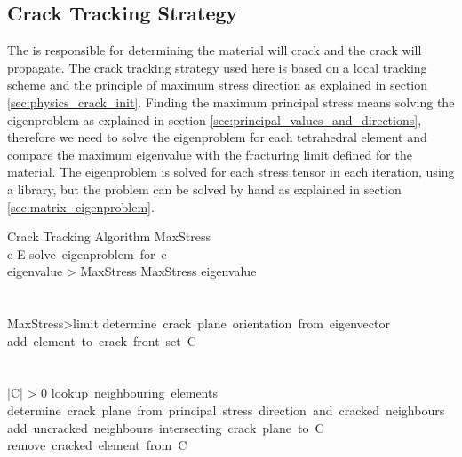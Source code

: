 \subsection*{Crack Tracking Strategy}
\label{sec:crack_tracking_strategy}
The  is responsible for determining
 the material will crack and  the crack will
propagate. The crack tracking strategy used here is
based on a local tracking scheme and the principle of maximum stress
direction as explained in section
\vref{sec:physics_crack_init}. Finding the maximum principal stress
means 
solving the eigenproblem as explained in section
\ref{sec:principal_values_and_directions}, therefore we need to
solve the eigenproblem for each tetrahedral element and compare the
maximum eigenvalue with the fracturing limit defined for the
material. The eigenproblem is solved for each stress tensor in each
iteration, using a 
library, but the problem can be solved by hand as 
explained in section \vref{sec:matrix_eigenproblem}. \\

\begin{center} 
\begin{minipage}[b]{\linewidth} 
\begin{pseudocode}[ruled]{Crack Tracking Algorithm}{ }
MaxStress \\
\FOREACH e \in E \DO
\BEGIN
  \mbox{solve eigenproblem for e}\\
  \IF eigenvalue > MaxStress \THEN
  MaxStress \GETS eigenvalue \\
\END \\ \\

\IF MaxStress>limit \THEN
\BEGIN
 \mbox{determine crack plane orientation from eigenvector}\\
 \mbox{add element to crack front set C}\\
\END \\ \\

\WHILE |C| > 0 \DO
 \BEGIN
 \mbox{lookup neighbouring elements}\\
  \mbox{determine crack plane from principal stress direction and
    cracked neighbours}\\
  \mbox{add uncracked neighbours intersecting crack plane to C} \\
  \mbox{remove cracked element from C}\\
  \END
\end{pseudocode} 
\end{minipage} 
\end{center} 

